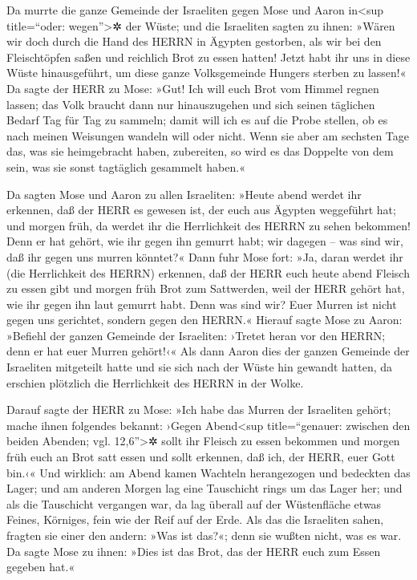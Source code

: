  Da murrte die ganze Gemeinde der Israeliten gegen Mose
und Aaron in\textless sup title=``oder: wegen''\textgreater✲ der Wüste;
 und die Israeliten sagten zu ihnen: »Wären wir doch durch
die Hand des HERRN in Ägypten gestorben, als wir bei den Fleischtöpfen
saßen und reichlich Brot zu essen hatten! Jetzt habt ihr uns in diese
Wüste hinausgeführt, um diese ganze Volksgemeinde Hungers sterben zu
lassen!«  Da sagte der HERR zu Mose: »Gut! Ich will euch
Brot vom Himmel regnen lassen; das Volk braucht dann nur hinauszugehen
und sich seinen täglichen Bedarf Tag für Tag zu sammeln; damit will ich
es auf die Probe stellen, ob es nach meinen Weisungen wandeln will oder
nicht.  Wenn sie aber am sechsten Tage das, was sie
heimgebracht haben, zubereiten, so wird es das Doppelte von dem sein,
was sie sonst tagtäglich gesammelt haben.«

 Da sagten Mose und Aaron zu allen Israeliten: »Heute
abend werdet ihr erkennen, daß der HERR es gewesen ist, der euch aus
Ägypten weggeführt hat;  und morgen früh, da werdet ihr
die Herrlichkeit des HERRN zu sehen bekommen! Denn er hat gehört, wie
ihr gegen ihn gemurrt habt; wir dagegen -- was sind wir, daß ihr gegen
uns murren könntet?«  Dann fuhr Mose fort: »Ja, daran
werdet ihr (die Herrlichkeit des HERRN) erkennen, daß der HERR euch
heute abend Fleisch zu essen gibt und morgen früh Brot zum Sattwerden,
weil der HERR gehört hat, wie ihr gegen ihn laut gemurrt habt. Denn was
sind wir? Euer Murren ist nicht gegen uns gerichtet, sondern gegen den
HERRN.«  Hierauf sagte Mose zu Aaron: »Befiehl der ganzen
Gemeinde der Israeliten: ›Tretet heran vor den HERRN; denn er hat euer
Murren gehört!‹«  Als dann Aaron dies der ganzen Gemeinde
der Israeliten mitgeteilt hatte und sie sich nach der Wüste hin gewandt
hatten, da erschien plötzlich die Herrlichkeit des HERRN in der Wolke.

 Darauf sagte der HERR zu Mose:  »Ich habe
das Murren der Israeliten gehört; mache ihnen folgendes bekannt: ›Gegen
Abend\textless sup title=``genauer: zwischen den beiden Abenden; vgl.
12,6''\textgreater✲ sollt ihr Fleisch zu essen bekommen und morgen früh
euch an Brot satt essen und sollt erkennen, daß ich, der HERR, euer Gott
bin.‹«  Und wirklich: am Abend kamen Wachteln
herangezogen und bedeckten das Lager; und am anderen Morgen lag eine
Tauschicht rings um das Lager her;  und als die
Tauschicht vergangen war, da lag überall auf der Wüstenfläche etwas
Feines, Körniges, fein wie der Reif auf der Erde.  Als
das die Israeliten sahen, fragten sie einer den andern: »Was ist das?«;
denn sie wußten nicht, was es war. Da sagte Mose zu ihnen: »Dies ist das
Brot, das der HERR euch zum Essen gegeben hat.«

